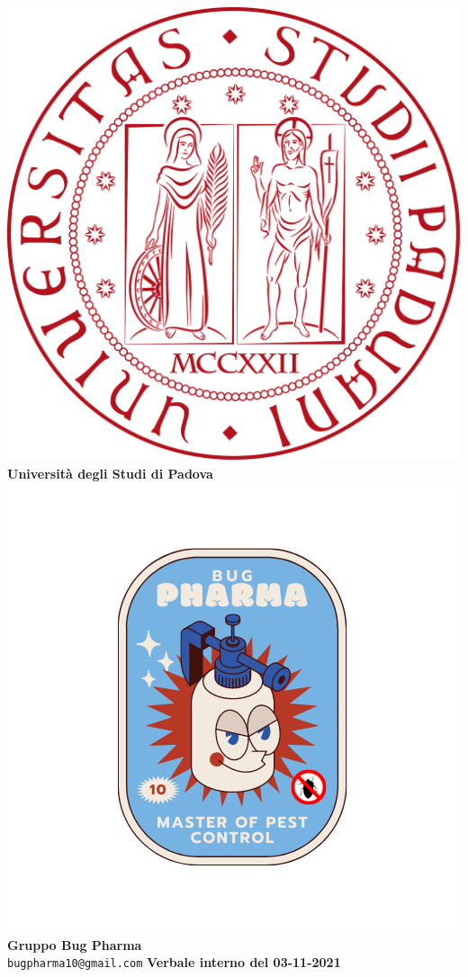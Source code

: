 \documentclass[11pt]{article}
\begin{document}
	\thispagestyle{empty}
	\begin{titlepage}
		\begin{center}
			\includegraphics[scale = 0.05]{../../Res/logo_unipd.png}\\
			\bigskip
			\large \textbf{Università degli Studi di Padova} \\
			\vfill
			\includegraphics[scale = 0.7]{../../Res/BugPharma_Logo.png}\\
			\huge \textbf{Gruppo Bug Pharma} \\
			\vfill
			\large \texttt{bugpharma10@gmail.com}
			\vfill
			\Huge \textbf{Verbale interno del 03-11-2021}\\
			

\end{center}
\end{titlepage}
\end{document}
